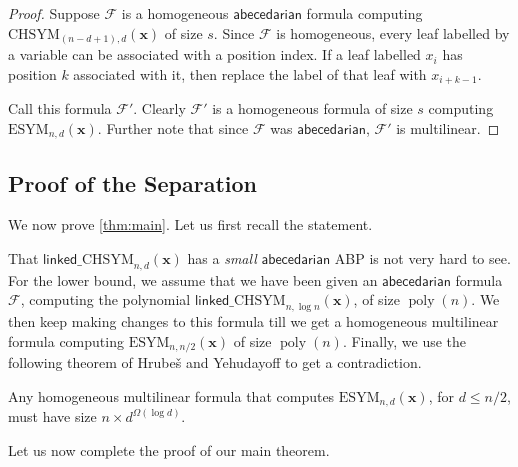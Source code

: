 \documentclass[10pt,a4paper]{article}
\def\Hrubes{Hrube{\v{s}}}
\def\poly{\operatorname{poly}}
\def\vecx{\mathbf{x}}
\newcommand{\form}{\textbf{$\mathcal{F}$}}
\newcommand{\abcd}{\mathsf{abecedarian}}
\newcommand{\esym}[2]{\mathrm{ESYM}_{#1,#2}}
\newcommand{\chsym}[2]{\mathrm{CHSYM}_{#1,#2}}
\newcommand{\lchsym}[2]{\mathrm{\mathsf{linked}\_CHSYM}_{#1,#2}}
\begin{document}
\begin{proof}
	Suppose $\form$ is a homogeneous $\abcd$ formula computing $\chsym{(n-d+1)}{d}(\vecx)$ of size $s$.
	Since $\form$ is homogeneous, every leaf labelled by a variable can be associated with a position index.
	If a leaf labelled $x_i$ has position $k$ associated with it, then replace the label of that leaf with $x_{i+k-1}$.
	
	Call this formula $\form'$.
	Clearly $\form'$ is a homogeneous formula of size $s$ computing $\esym{n}{d}(\vecx)$.
	Further note that since $\form$ was $\abcd$, $\form'$ is multilinear. 
\end{proof}


\subsection{Proof of the Separation}

We now prove \autoref{thm:main}. 
Let us first recall the statement.

\mainThm*

That $\lchsym{n}{d}(\vecx)$ has a \emph{small} $\abcd$ ABP is not very hard to see.
For the lower bound, we assume that we have been given an $\abcd$ formula $\form$, computing the polynomial $\lchsym{n}{\log n}(\vecx)$, of size $\poly(n)$.
We then keep making changes to this formula till we get a homogeneous multilinear formula computing $\esym{n}{n/2}(\vecx)$ of size $\poly(n)$.
Finally, we use the following theorem of {\Hrubes} and Yehudayoff \cite{HY11} to get a contradiction.

\begin{theorem}\label{thm:hom-ml-lb}
	Any homogeneous multilinear formula that computes $\esym{n}{d}(\vecx)$, for $d \leq n/2$, must have size $n \times d^{\Omega(\log d)}$.
\end{theorem}

\noindent Let us now complete the proof of our main theorem.
\end{document}
